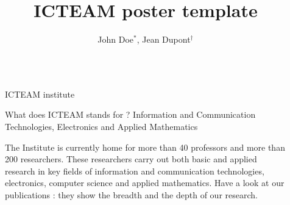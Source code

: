\documentclass[final]{beamer}
\title{ICTEAM poster template}
\author{John Doe$^*$, Jean Dupont$^\dagger$}
\institute{$^*$ ICTEAM (UCLouvain), $^\dagger$ LIDS (MIT)}
\newlength{\sepwid}
\newlength{\onecolwid}
\begin{document}

\setlength{\belowcaptionskip}{2ex} %
\setlength\belowdisplayshortskip{2ex} %

\begin{frame}[t,fragile] %

\begin{columns}[t] %

\begin{column}{\sepwid}\end{column} %

\begin{column}{\onecolwid} %
  \begin{block}{ICTEAM institute}
  \begin{alertblock}{What does ICTEAM stands for ?}
    Information and Communication Technologies, Electronics and Applied Mathematics
  \end{alertblock}

  The Institute is currently home for more than 40 professors and more than 200 researchers. These researchers carry out both basic and applied research in key fields of information and communication technologies, electronics, computer science and applied mathematics. Have a look at our publications : they show the breadth and the depth of our research.

  \end{block}

\end{column}

\begin{column}{\sepwid}\end{column} %


\end{columns}
\end{frame}
\end{document}
